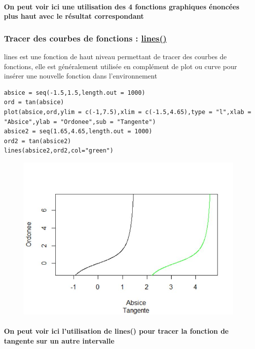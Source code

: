 \documentclass{article}
\begin{document}
\paragraph{On peut voir ici une utilisation des 4 fonctions graphiques énoncées plus haut avec le résultat correspondant}
\subsubsection{Tracer des courbes de fonctions : \href{https://www.rdocumentation.org/packages/graphics/versions/3.6.2/topics/lines}{lines()}}\label{lines}
lines est une fonction de haut niveau permettant de tracer des courbes de fonctions, elle est généralement utilisée en complément de plot ou curve pour insérer une nouvelle fonction dans l'environnement

\begin{verbatim}
absice = seq(-1.5,1.5,length.out = 1000)
ord = tan(absice)
plot(absice,ord,ylim = c(-1,7.5),xlim = c(-1.5,4.65),type = "l",xlab = "Absice",ylab = "Ordonee",sub = "Tangente")
absice2 = seq(1.65,4.65,length.out = 1000)
ord2 = tan(absice2)
lines(absice2,ord2,col="green")
\end{verbatim}


\begin{figure}[htbp]
    \centering
    \includegraphics[scale=0.9]{graphe.JPG}
    \label{exemple_lines}
\end{figure}
\paragraph{On peut voir ici l'utilisation de lines() pour tracer la fonction de tangente sur un autre intervalle}
\newpage
\end{document}
